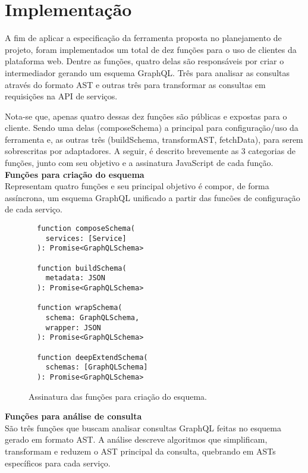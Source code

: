 \section{Implementação}

A fim de aplicar a especificação da ferramenta proposta no planejamento de projeto, foram implementados um total de dez funções para o uso de clientes da plataforma web. Dentre as funções, quatro delas são responsáveis por criar o intermediador gerando um esquema GraphQL. Três para analisar as consultas através do formato AST e outras três para transformar as consultas em requisições na API de serviços. 

Nota-se que, apenas quatro dessas dez funções são públicas e expostas para o cliente. Sendo uma delas (composeSchema) a principal para configuração/uso da ferramenta e, as outras três (buildSchema, transformAST, fetchData), para serem sobrescritas por adaptadores. A seguir, é descrito brevemente as 3 categorias de funções, junto com seu objetivo e a assinatura JavaScript de cada função. \\

\textbf{Funções para criação do esquema} \\

Representam quatro funções e seu principal objetivo é compor, de forma assíncrona, um esquema GraphQL unificado a partir das funcões de configuração de cada serviço.

\begin{figure}[H]
  \centering
  \begin{verbatim}
  function composeSchema(
    services: [Service]
  ): Promise<GraphQLSchema>

  function buildSchema(
    metadata: JSON
  ): Promise<GraphQLSchema>

  function wrapSchema(
    schema: GraphQLSchema, 
    wrapper: JSON
  ): Promise<GraphQLSchema>

  function deepExtendSchema(
    schemas: [GraphQLSchema]
  ): Promise<GraphQLSchema>
  \end{verbatim}
  \caption{Assinatura das funções para criação do esquema.}
\end{figure}

\textbf{Funções para análise de consulta} \\

São três funções que buscam analisar consultas GraphQL feitas no esquema gerado em formato AST. A análise descreve algoritmos que simplificam, transformam e reduzem o AST principal da consulta, quebrando em ASTs específicos para cada serviço.

